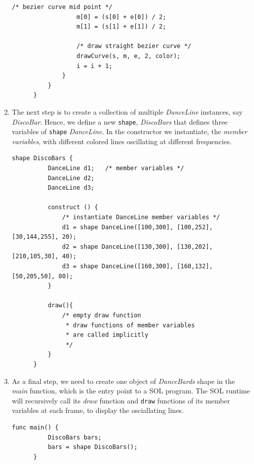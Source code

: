 \documentclass[letterpaper,12pt]{report}
\begin{document}
\begin{enumerate}
\begin{lstlisting}[style=sol, aboveskip=1pt]
                  /* bezier curve mid point */            
                  m[0] = (s[0] + e[0]) / 2;
                  m[1] = (s[1] + e[1]) / 2;

                  /* draw straight bezier curve */
                  drawCurve(s, m, e, 2, color);
                  i = i + 1;
              }
          }
      }
    \end{lstlisting}

    \item The next step is to create a collection of multiple \textit{DanceLine} instances, say \textit{DiscoBar}. Hence, we define a new \texttt{shape}, \textit{DiscoBars} that defines three variables of \texttt{shape} \textit{DanceLine}. In the constructor we instantiate, the \textit{member variables}, with different colored lines oscillating at different frequencies.\\

    \begin{lstlisting}[style=sol, aboveskip=1pt]
      shape DiscoBars {
          DanceLine d1;   /* member variables */
          DanceLine d2;
          DanceLine d3;

          construct () {
              /* instantiate DanceLine member variables */
              d1 = shape DanceLine([100,300], [100,252], [30,144,255], 20);
              d2 = shape DanceLine([130,300], [130,202], [210,105,30], 40);
              d3 = shape DanceLine([160,300], [160,132], [50,205,50], 80);
          }

          draw(){
              /* empty draw function 
               * draw functions of member variables
               * are called implicitly
               */
          }
      }
    \end{lstlisting}
  
    \item As a final step, we need to create one object of \textit{DanceBards} shape in the \textit{main} function, which is the entry point to a SOL program. The SOL runtime will recursively call its \textit{draw} function and \texttt{draw} functions of its member variables at each frame, to display the osciallating lines.\\

    \begin{lstlisting}[style=sol, aboveskip=1pt]
      func main() {
          DiscoBars bars;
          bars = shape DiscoBars();
      }
    \end{lstlisting}
  \end{enumerate}
\end{document}
